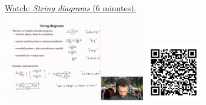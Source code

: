 
\begin{minipage}{10cm}
    \href{https://act4e-spring21.netlify.app/videos/spring2021-par-feedback:mon-cat:string-diag.html}{Watch: \emph{String diagrams} (6 minutes).}
        
    \href{https://act4e-spring21.netlify.app/videos/spring2021-par-feedback:mon-cat:string-diag.html}{\includegraphics[height=3.5cm]{spring2021-par-feedback:mon-cat:string-diag/thumbnails.jpg}}
    \href{https://act4e-spring21.netlify.app/videos/spring2021-par-feedback:mon-cat:string-diag.html}{\includegraphics[height=2.5cm]{spring2021-par-feedback:mon-cat:string-diag/qrcode.png}}
\end{minipage}
